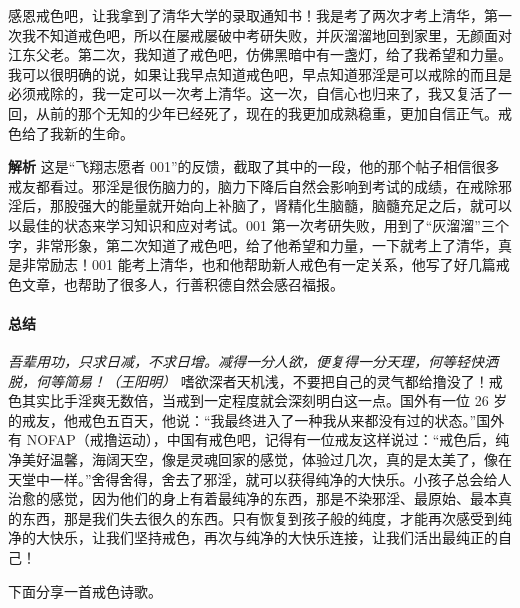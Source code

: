 \begin{case}
    感恩戒色吧，让我拿到了清华大学的录取通知书！我是考了两次才考上清华，第一次我不知道戒色吧，所以在屡戒屡破中考研失败，并灰溜溜地回到家里，无颜面对江东父老。第二次，我知道了戒色吧，仿佛黑暗中有一盏灯，给了我希望和力量。我可以很明确的说，如果让我早点知道戒色吧，早点知道邪淫是可以戒除的而且是必须戒除的，我一定可以一次考上清华。这一次，自信心也归来了，我又复活了一回，从前的那个无知的少年已经死了，现在的我更加成熟稳重，更加自信正气。戒色给了我新的生命。

    \textbf{解析} 这是“飞翔志愿者 001”的反馈，截取了其中的一段，他的那个帖子相信很多戒友都看过。邪淫是很伤脑力的，脑力下降后自然会影响到考试的成绩，在戒除邪淫后，那股强大的能量就开始向上补脑了，肾精化生脑髓，脑髓充足之后，就可以以最佳的状态来学习知识和应对考试。001 第一次考研失败，用到了“灰溜溜”三个字，非常形象，第二次知道了戒色吧，给了他希望和力量，一下就考上了清华，真是非常励志！001 能考上清华，也和他帮助新人戒色有一定关系，他写了好几篇戒色文章，也帮助了很多人，行善积德自然会感召福报。
\end{case}

\paragraph*{总结}

\textit{吾辈用功，只求日减，不求日增。减得一分人欲，便复得一分天理，何等轻快洒脱，何等简易！（王阳明）} 嗜欲深者天机浅，不要把自己的灵气都给撸没了！戒色其实比手淫爽无数倍，当戒到一定程度就会深刻明白这一点。国外有一位 26 岁的戒友，他戒色五百天，他说：“我最终进入了一种我从来都没有过的状态。”国外有 NOFAP（戒撸运动），中国有戒色吧，记得有一位戒友这样说过：“戒色后，纯净美好温馨，海阔天空，像是灵魂回家的感觉，体验过几次，真的是太美了，像在天堂中一样。”舍得舍得，舍去了邪淫，就可以获得纯净的大快乐。小孩子总会给人治愈的感觉，因为他们的身上有着最纯净的东西，那是不染邪淫、最原始、最本真的东西，那是我们失去很久的东西。只有恢复到孩子般的纯度，才能再次感受到纯净的大快乐，让我们坚持戒色，再次与纯净的大快乐连接，让我们活出最纯正的自己！

下面分享一首戒色诗歌。

